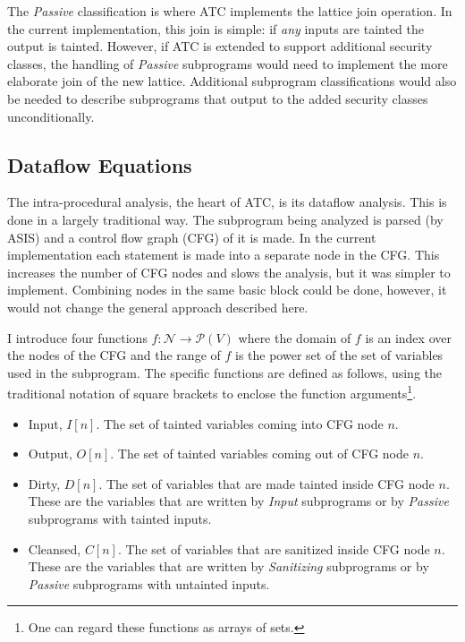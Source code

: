 \documentclass{article}
\begin{document}
The \textit{Passive} classification is where ATC implements the lattice join operation. In the current implementation, this join is simple: if \emph{any} inputs are tainted the output is tainted. However, if ATC is extended to support additional security classes, the handling of \textit{Passive} subprograms would need to implement the more elaborate join of the new lattice. Additional subprogram classifications would also be needed to describe subprograms that output to the added security classes unconditionally.

\subsection{Dataflow Equations}

The intra-procedural analysis, the heart of ATC, is its dataflow analysis. This is done in a largely traditional way. The subprogram being analyzed is parsed (by ASIS) and a control flow graph (CFG) of it is made. In the current implementation each statement is made into a separate node in the CFG. This increases the number of CFG nodes and slows the analysis, but it was simpler to implement. Combining nodes in the same basic block could be done, however, it would not change the general approach described here.

I introduce four functions $f : \mathcal{N} \rightarrow \mathcal{P}(V)$ where the domain of $f$ is an index over the nodes of the CFG and the range of $f$ is the power set of the set of variables used in the subprogram. The specific functions are defined as follows, using the traditional notation of square brackets to enclose the function arguments\footnote{One can regard these functions as arrays of sets.}.

\begin{itemize}

\item Input, $I[n]$. The set of tainted variables coming into CFG node $n$.

\item Output, $O[n]$. The set of tainted variables coming out of CFG node $n$.

\item Dirty, $D[n]$. The set of variables that are made tainted inside CFG node $n$. These are the variables that are written by \textit{Input} subprograms or by \textit{Passive} subprograms with tainted inputs.

\item Cleansed, $C[n]$. The set of variables that are sanitized inside CFG node $n$. These are the variables that are written by \textit{Sanitizing} subprograms or by \textit{Passive} subprograms with untainted inputs.

\end{itemize}
\end{document}
